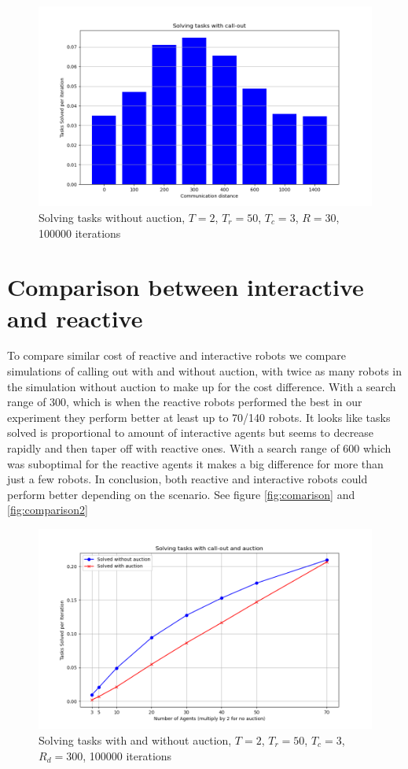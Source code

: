 \documentclass{article}
\begin{document}
\begin{figure}
	\includegraphics[width=\textwidth]{search_ranges.png}
	\caption{Solving tasks without auction, $T=2$, $T_r=50$, $T_c=3$, $R=30$, 100000 iterations}
	\label{fig:search}
\end{figure}


\section{Comparison between interactive and reactive}
To compare similar cost of reactive and interactive robots we compare simulations of calling out with and without auction, with twice as many robots in the simulation without auction to make up for the cost difference. With a search range of 300, which is when the reactive robots performed the best in our experiment they perform better at least up to 70/140 robots. It looks like tasks solved is proportional to amount of interactive agents but seems to decrease rapidly and then taper off with reactive ones. With a search range of 600 which was suboptimal for the reactive agents it makes a big difference for more than just a few robots. In conclusion, both reactive and interactive robots could perform better depending on the scenario. See figure \ref{fig:comarison} and \ref{fig:comparison2}

\begin{figure}
	\includegraphics[width=\textwidth]{search_ranges_comparison.png}
	\caption{Solving tasks with and without auction, $T=2$, $T_r=50$, $T_c=3$, $R_d = 300$, 100000 iterations}
	\label{fig:comparison}
\end{figure}
\end{document}
